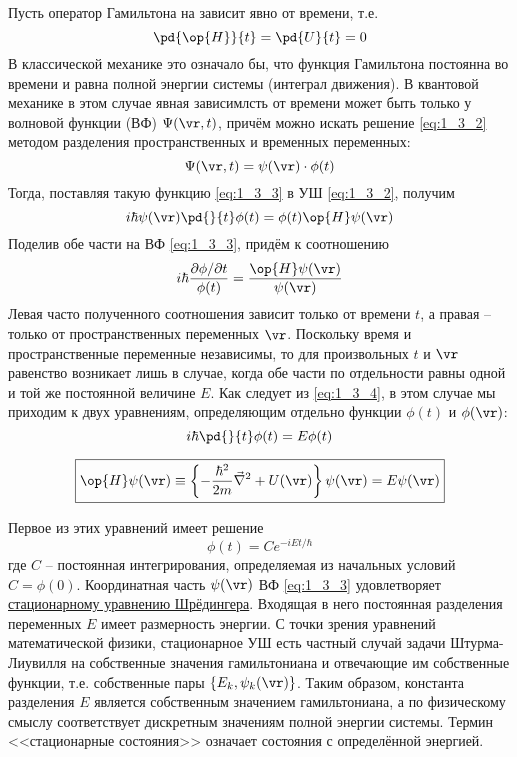 Пусть оператор Гамильтона на зависит явно от времени, т.е.
$$\pd{\op{H}}{t} = \pd{U}{t} = 0$$
В классической механике это означало бы, что функция Гамильтона постоянна во времени и равна полной энергии системы (интеграл движения). В квантовой механике в этом случае явная зависимлсть от времени может быть только у волновой функции (ВФ) $\Psi(\vr,t)$, причём можно искать решение \eqref{eq:1_3_2} методом разделения пространственных и временных переменных:%
%
\begin{equation}
\label{eq:1_3_3}
\Psi(\vr,t) = \psi(\vr) \cdot \phi (t)
\end{equation}%
%
Тогда, поставляя такую функцию \eqref{eq:1_3_3} в УШ \eqref{eq:1_3_2}, получим
$$
i \hbar \psi(\vr) \pd{}{t} \phi (t) = \phi (t) \op{H} \psi(\vr)
$$%
%
Поделив обе части на ВФ \eqref{eq:1_3_3}, придём к соотношению
\begin{equation}
\label{eq:1_3_4}
i \hbar \frac{\partial \phi / \partial t}{\phi(t)} = \frac{\op{H} \psi(\vr)}{\psi(\vr)}
\end{equation}
Левая часто полученного соотношения зависит только от времени $t$, а правая -- только от пространственных переменных $\vr$. Поскольку время и пространственные переменные независимы, то для произвольных $t$ и $\vr$ равенство возникает лишь в случае, когда обе части по отдельности равны одной и той же постоянной величине $E$. Как следует из \eqref{eq:1_3_4}, в этом случае мы приходим к двух уравнениям, определяющим отдельно функции $\phi(t)$ и $\phi(\vr)$:
\begin{equation}
\label{eq:1_3_5}
i \hbar \pd{}{t} \phi(t) = E \phi(t)
\end{equation}

\begin{equation}
\label{eq:1_3_6}
\boxed{\op{H} \psi(\vr) \equiv \left\{ -\frac{\hbar^2}{2m} \vec{\nabla}^2 + U(\vr) \right\}\psi(\vr) = E\psi(\vr)}
\end{equation}

Первое из этих уравнений имеет решение
$$
\phi(t)=C e^{-iEt/\hbar}
$$
где $C$ -- постоянная интегрирования, определяемая из начальных условий $C = \phi(0)$. Координатная часть $\psi(\vr)$ ВФ \eqref{eq:1_3_3} удовлетворяет \underline{стационарному уравнению Шрёдингера}. Входящая в него постоянная разделения переменных $E$ имеет размерность энергии. С точки зрения уравнений математической физики, стационарное УШ есть частный случай задачи Штурма-Лиувилля на собственные значения гамильтониана и отвечающие им собственные функции, т.е. собственные пары $\{E_k, \psi_k(\vr)\}$. Таким образом, константа разделения $E$ является собственным значением гамильтониана, а по физическому смыслу соответствует дискретным значениям полной энергии системы. Термин <<стационарные состояния>> означает состояния с определённой энергией.

